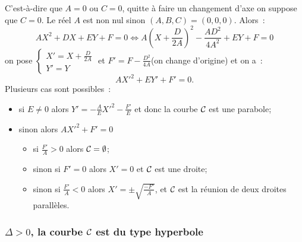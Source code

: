 C'est-à-dire que \(A = 0\) ou \(C = 0\), quitte à faire un changement d'axe on
suppose que \(C = 0\). Le réel \(A\) est non nul sinon \((A, B, C) = (0, 0, 0)\).
Alors~:
\begin{equation}
  AX^2 + DX + EY + F = 0 \iff A\left(X + \frac{D}{2A}\right)^2-\frac{AD^2}{4A^2}
  + EY + F = 0
\end{equation}
on pose \(\begin{cases}X' = X + \frac{D}{2A} \\ Y' = Y\end{cases}\) et
\(F' = F - \frac{D^2}{4A}\)(on change d'origine) et on a~:
\begin{equation}
  AX'^2 + EY' + F' = 0.
\end{equation}
Plusieurs cas sont possibles~:
\begin{itemize}
  \item si \(E \neq 0\) alors \(Y' = -\frac{A}{E}X'^2 - \frac{F'}{E}\) et donc
    la courbe \(\mathcal{C}_{{}}\) est une parabole;
  \item sinon alors \(AX'^2 + F' = 0\)
    \begin{itemize}
      \item si \(\frac{F'}{A}>0\) alors \(\mathcal{C}_{{} } =\emptyset\);
      \item sinon si \(F' = 0\) alors \(X' = 0\) et \(\mathcal{C}_{{}}\) est une droite;
      \item sinon si \(\frac{F'}{A}<0\) alors \(X' = \pm \sqrt{\frac{-F'}{A}}\),
        et \(\mathcal{C}_{{}}\) est la réunion de deux droites parallèles.
    \end{itemize}
\end{itemize}

\subsubsection{\(\Delta>0\), la courbe \(\mathcal{C}_{{}}\) est du type hyperbole}

